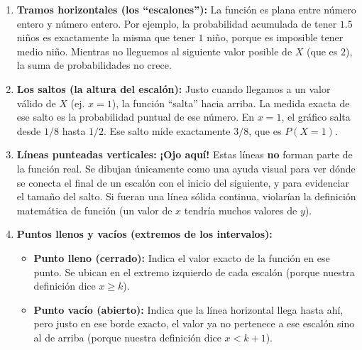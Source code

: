 \documentclass[11pt, a4paper]{article}
\begin{document}
\begin{enumerate}
    \item \textbf{Tramos horizontales (los ``escalones''):} La función es plana entre número entero y número entero. Por ejemplo, la probabilidad acumulada de tener $1.5$ niños es exactamente la misma que tener $1$ niño, porque es imposible tener medio niño. Mientras no lleguemos al siguiente valor posible de $X$ (que es $2$), la suma de probabilidades no crece.
    \item \textbf{Los saltos (la altura del escalón):} Justo cuando llegamos a un valor válido de $X$ (ej. $x=1$), la función ``salta'' hacia arriba. La medida exacta de ese salto es la probabilidad puntual de ese número. En $x=1$, el gráfico salta desde $1/8$ hasta $1/2$. Ese salto mide exactamente $3/8$, que es $P(X=1)$.
    \item \textbf{Líneas punteadas verticales:} \textbf{¡Ojo aquí!} Estas líneas \textbf{no} forman parte de la función real. Se dibujan únicamente como una ayuda visual para ver dónde se conecta el final de un escalón con el inicio del siguiente, y para evidenciar el tamaño del salto. Si fueran una línea sólida continua, violarían la definición matemática de función (un valor de $x$ tendría muchos valores de $y$).
    \item \textbf{Puntos llenos y vacíos (extremos de los intervalos):}
    \begin{itemize}
        \item \textbf{Punto lleno (cerrado):} Indica el valor exacto de la función en ese punto. Se ubican en el extremo izquierdo de cada escalón (porque nuestra definición dice $x \ge k$).
        \item \textbf{Punto vacío (abierto):} Indica que la línea horizontal llega hasta ahí, pero justo en ese borde exacto, el valor ya no pertenece a ese escalón sino al de arriba (porque nuestra definición dice $x < k+1$).
    \end{itemize}
\end{enumerate}
\end{document}
